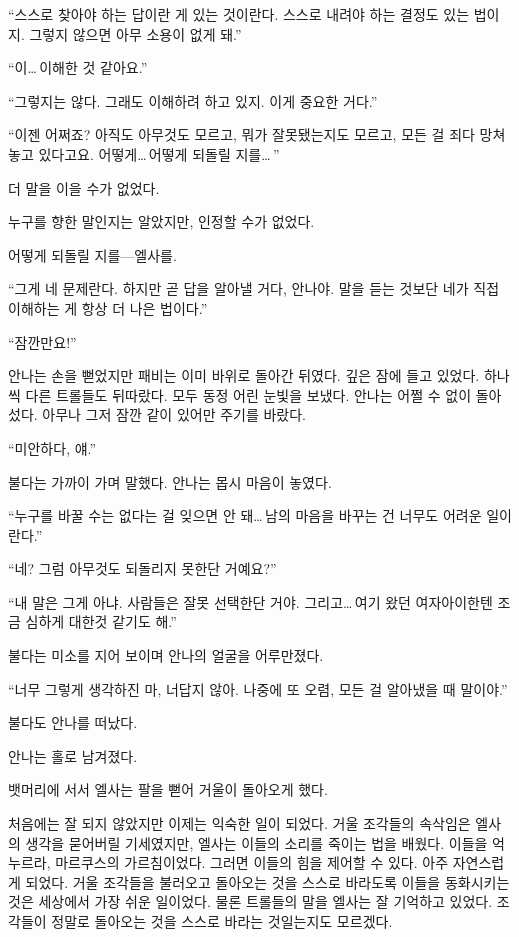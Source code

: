 ``스스로 찾아야 하는 답이란 게 있는 것이란다. 스스로 내려야 하는 결정도 있는 법이지. 그렇지 않으면 아무 소용이 없게 돼.''

``이\ldots\,이해한 것 같아요.''

``그렇지는 않다. 그래도 이해하려 하고 있지. 이게 중요한 거다.''

``이젠 어쩌죠? 아직도 아무것도 모르고, 뭐가 잘못됐는지도 모르고, 모든 걸 죄다 망쳐놓고 있다고요. 어떻게\ldots\,어떻게 되돌릴 지를\ldots\,''

더 말을 이을 수가 없었다.

누구를 향한 말인지는 알았지만, 인정할 수가 없었다.

어떻게 되돌릴 지를—엘사를.

``그게 네 문제란다. 하지만 곧 답을 알아낼 거다, 안나야. 말을 듣는 것보단 네가 직접 이해하는 게 항상 더 나은 법이다.''

``잠깐만요!''

안나는 손을 뻗었지만 패비는 이미 바위로 돌아간 뒤였다. 깊은 잠에 들고 있었다. 하나씩 다른 트롤들도 뒤따랐다. 모두 동정 어린 눈빛을 보냈다. 안나는 어쩔 수 없이 돌아섰다. 아무나 그저 잠깐 같이 있어만 주기를 바랐다.

``미안하다, 얘.''

불다는 가까이 가며 말했다. 안나는 몹시 마음이 놓였다.

``누구를 바꿀 수는 없다는 걸 잊으면 안 돼\ldots\,남의 마음을 바꾸는 건 너무도 어려운 일이란다.''

``네? 그럼 아무것도 되돌리지 못한단 거예요?''

``내 말은 그게 아냐. 사람들은 잘못 선택한단 거야. 그리고\ldots\,여기 왔던 여자아이한텐 조금 심하게 대한것 같기도 해.''

불다는 미소를 지어 보이며 안나의 얼굴을 어루만졌다.

``너무 그렇게 생각하진 마, 너답지 않아. 나중에 또 오렴, 모든 걸 알아냈을 때 말이야.''

불다도 안나를 떠났다.

안나는 홀로 남겨졌다.

\textbreak

뱃머리에 서서 엘사는 팔을 뻗어 거울이 돌아오게 했다.

처음에는 잘 되지 않았지만 이제는 익숙한 일이 되었다. 거울 조각들의 속삭임은 엘사의 생각을 묻어버릴 기세였지만, 엘사는 이들의 소리를 죽이는 법을 배웠다. 이들을 억누르라, 마르쿠스의 가르침이었다. 그러면 이들의 힘을 제어할 수 있다. 아주 자연스럽게 되었다. 거울 조각들을 불러오고 돌아오는 것을 스스로 바라도록 이들을 동화시키는 것은 세상에서 가장 쉬운 일이었다. 물론 트롤들의 말을 엘사는 잘 기억하고 있었다. 조각들이 정말로 돌아오는 것을 스스로 바라는 것일는지도 모르겠다.

